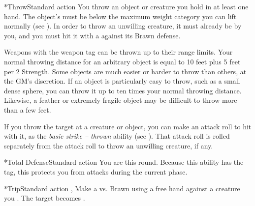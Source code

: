   \begin{activeability}*{Throw}{Standard action}
    \abilitytags {}
    \rankline
    You throw an object or creature you hold in at least one hand.
    The object's  must be below the maximum weight category you can lift normally (see ).
    In order to throw an unwilling creature, it must already be \grappled by you, and you must hit it with a  against its Brawn defense.

    Weapons with the  weapon tag can be thrown up to their range limits.
    Your normal throwing distance for an arbitrary object is equal to 10 feet plus 5 feet per 2 Strength.
    Some objects are much easier or harder to throw than others, at the GM's discretion.
    If an object is particularly easy to throw, such as a small dense sphere, you can throw it up to ten times your normal throwing distance.
    Likewise, a feather or extremely fragile object may be difficult to throw more than a few feet.

    If you throw the target at a creature or object, you can make an attack roll to hit with it, as the \textit{basic strike -- thrown} ability (see ).
    That attack roll is rolled separately from the attack roll to throw an unwilling creature, if any.
  \end{activeability}

  \begin{activeability}*{Total Defense}{Standard action}
    \abilitytags {}
    \rankline
    You are \braced this round.
    Because this ability has the  tag, this protects you from attacks during the current phase.
  \end{activeability}

  \begin{activeability}*{Trip}{Standard action}
    \abilitytags {}, 
    \rankline
    Make a  vs. Brawn using a free hand against a creature you .
    \hit The target becomes \prone.
  \end{activeability}

